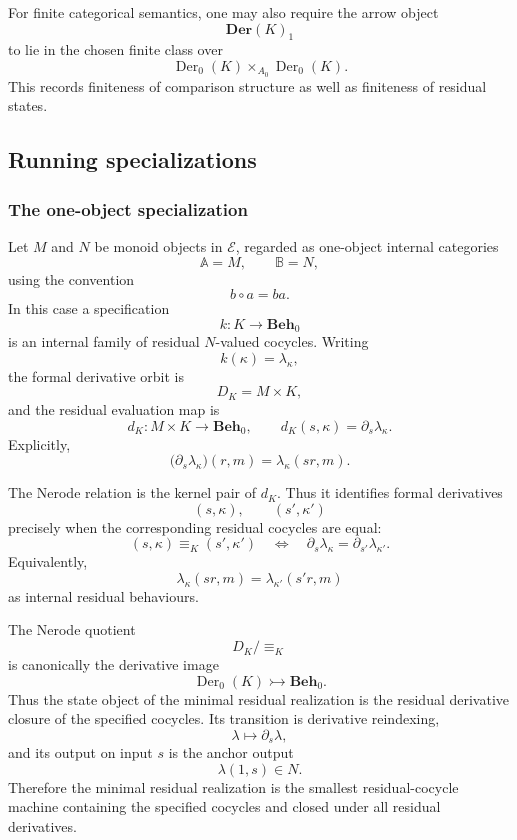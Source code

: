 \begin{remark}
\label{rem:finite-arrow-object}
    For finite categorical semantics, one may also require the arrow object
    \[
        \mathbf{Der}(K)_1
    \]
    to lie in the chosen finite class over
    \[
        \operatorname{Der}_0(K)\times_{A_0}\operatorname{Der}_0(K).
    \]
    This records finiteness of comparison structure as well as finiteness of residual states.
\end{remark}

\subsection{Running specializations}
\label{subsec:myhill-nerode-running-specializations}

\subsubsection{The one-object specialization}

Let \(M\) and \(N\) be monoid objects in \(\mathcal E\), regarded as one-object internal categories
\[
    \mathbb A=M,
    \qquad
    \mathbb B=N,
\]
using the convention
\[
    b\circ a=ba.
\]
In this case a specification
\[
    k:K\to\mathbf{Beh}_0
\]
is an internal family of residual \(N\)-valued cocycles. Writing
\[
    k(\kappa)=\lambda_\kappa,
\]
the formal derivative orbit is
\[
    D_K=M\times K,
\]
and the residual evaluation map is
\[
    d_K:M\times K\to\mathbf{Beh}_0,
    \qquad
    d_K(s,\kappa)=\partial_s\lambda_\kappa.
\]
Explicitly,
\[
    \bigl(\partial_s\lambda_\kappa\bigr)(r,m)
        =
    \lambda_\kappa(sr,m).
\]

The Nerode relation is the kernel pair of \(d_K\). Thus it identifies formal derivatives
\[
    (s,\kappa),
    \qquad
    (s',\kappa')
\]
precisely when the corresponding residual cocycles are equal:
\[
    (s,\kappa)\equiv_K(s',\kappa')
    \quad\Longleftrightarrow\quad
    \partial_s\lambda_\kappa
        =
    \partial_{s'}\lambda_{\kappa'}.
\]
Equivalently,
\[
    \lambda_\kappa(sr,m)
        =
    \lambda_{\kappa'}(s'r,m)
\]
as internal residual behaviours.

The Nerode quotient
\[
    D_K/{\equiv_K}
\]
is canonically the derivative image
\[
    \operatorname{Der}_0(K)
        \rightarrowtail
    \mathbf{Beh}_0.
\]
Thus the state object of the minimal residual realization is the residual derivative closure of the specified cocycles. Its transition is derivative reindexing,
\[
    \lambda\longmapsto \partial_s\lambda,
\]
and its output on input \(s\) is the anchor output
\[
    \lambda(1,s)\in N.
\]
Therefore the minimal residual realization is the smallest residual-cocycle machine containing the specified cocycles and closed under all residual derivatives.

